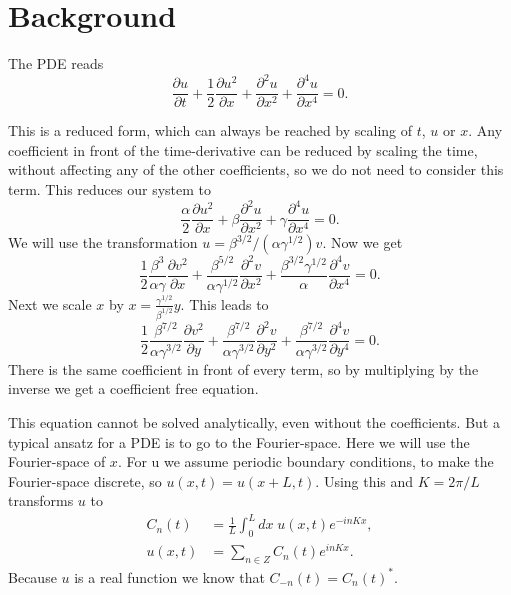 \section{Background}
The PDE reads~\cite{ruyer-quil2014dynamics}
\begin{equation}
  \frac{\partial u }{\partial t} + \frac{1}{2} \frac{\partial u^2 }{\partial x} + \frac{\partial^2 u }{\partial x^2} + \frac{\partial^4 u }{\partial x^4} = 0.\label{eq:PDE}
\end{equation}

This is a reduced form, which can always be reached by scaling of $t$, $u$ or $x$.
Any coefficient in front of the time-derivative can be reduced by scaling the time, without affecting any of the other coefficients, so we do not need to consider this term.
This reduces our system to
\begin{equation}
  \frac{\alpha}{2} \frac{\partial u^2 }{\partial x} + \beta \frac{\partial^2 u }{\partial x^2} + \gamma \frac{\partial^4 u }{\partial x^4} = 0.
\end{equation}
We will use the transformation $ u =\beta^{3/2}/(\alpha \gamma^{1/2}) v $.
Now we get
\begin{equation}
  \frac{1}{2} \frac{\beta^3}{\alpha \gamma} \frac{\partial v^2 }{\partial x} + \frac{\beta^{5/2}}{\alpha \gamma^{1/2}} \frac{\partial^2 v }{\partial x^2} + \frac{\beta^{3/2} \gamma^{1/2}}{\alpha} \frac{\partial^4 v }{\partial x^4} = 0.
\end{equation}
Next we scale $x$ by $ x = \frac{\gamma^{1/2}}{\beta^{1/2}} y $.
This leads to
\begin{equation}
  \frac{1}{2} \frac{\beta^{7/2}}{\alpha \gamma^{3/2}} \frac{\partial v^2 }{\partial y} + \frac{\beta^{7/2}}{\alpha \gamma^{3/2}} \frac{\partial^2 v }{\partial y^2} + \frac{\beta^{7/2}}{\alpha \gamma^{3/2}} \frac{\partial^4 v }{\partial y^4} = 0.
\end{equation}
There is the same coefficient in front of every term, so by multiplying by the inverse we get a coefficient free equation.

This equation cannot be solved analytically, even without the coefficients.
But a typical ansatz for a PDE is to go to the Fourier-space.
Here we will use the Fourier-space of $x$.
For u we assume periodic boundary conditions, to make the Fourier-space discrete, so $ u(x, t) = u(x + L, t) $.
Using this and $ K = 2 \pi/L $ transforms $u$ to
\begin{align}
  C_n(t) & = \frac{1}{L} \int_0^L dx \; u(x,t) e^{-in K x}, \\
  u(x, t) & = \sum_{n \in Z} C_n (t) e^{in K x}. \label{eq:inverse}
\end{align}
Because $u$ is a real function we know that $C_{-n}(t) = {C_n(t)}^{*}$.

